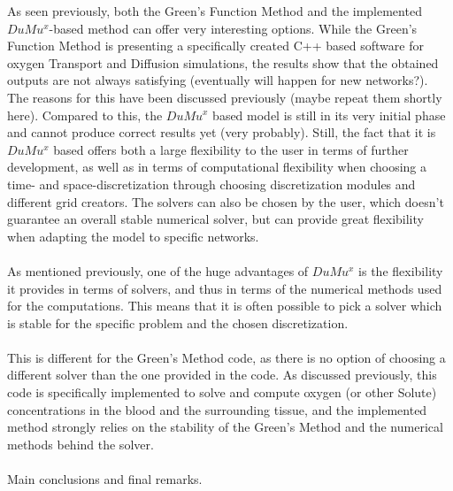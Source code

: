As seen previously, both the Green's Function Method and the implemented $DuMu^x$-based method can offer very interesting options. While the Green's Function Method is presenting a specifically created C++ based software for oxygen Transport and Diffusion simulations, the results show that the obtained outputs are not always satisfying (eventually will happen for new networks?). The reasons for this have been discussed previously (maybe repeat them shortly here).
Compared to this, the $DuMu^x$ based model is still in its very initial phase and cannot produce correct results yet (very probably). Still, the fact that it is $DuMu^x$ based offers both a large flexibility to the user in terms of further development, as well as in terms of computational flexibility when choosing a time- and space-discretization through choosing discretization modules and different grid creators. The solvers can also be chosen by the user, which doesn't guarantee an overall stable numerical solver, but can provide great flexibility when adapting the model to specific networks.
\\
\\As mentioned previously, one of the huge advantages of $DuMu^x$ is the flexibility it provides in terms of solvers, and thus in terms of the numerical methods used for the computations. This means that it is often possible to pick a solver which is stable for the specific problem and the chosen discretization.
\\
\\This is different for the Green's Method code, as there is no option of choosing a different solver than the one provided in the code. As discussed previously, this code is specifically implemented to solve and compute oxygen (or other Solute) concentrations in the blood and the surrounding tissue, and the implemented method strongly relies on the stability of the Green's Method and the numerical methods behind the solver.
\\
\\Main conclusions and final remarks.